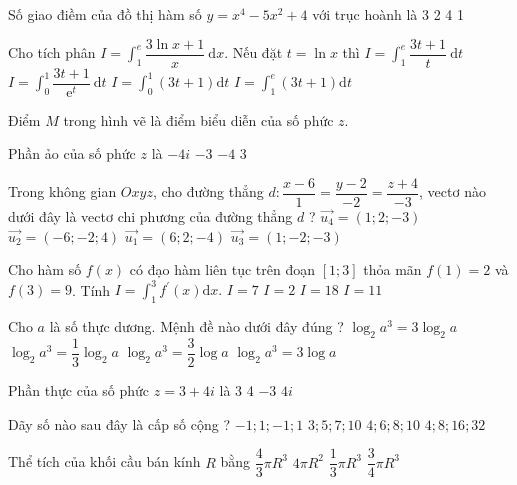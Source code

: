 \begin{ex}
 Số giao điềm của đồ thị hàm số $y=x^{4}-5 x^{2}+4$ với trục hoành là
\choice
{3}
{2}
{4}
{1}
\end{ex}

\begin{ex}
 Cho tích phân $I=\int_{1}^{e} \dfrac{3 \ln x+1}{x} \mathrm{~d} x$. Nếu đặt $t=\ln x$ thì
\choice
{$I=\int_{1}^{e} \dfrac{3 t+1}{t} \mathrm{~d} t$}
{$I=\int_{0}^{1} \dfrac{3 t+1}{\mathrm{e}^{t}} \mathrm{~d} t$}
{$I=\int_{0}^{1}(3 t+1) \mathrm{d} t$}
{$I=\int_{1}^{e}(3 t+1) \mathrm{d} t$}
\end{ex}

\begin{ex}
 Điểm $M$ trong hình vẽ là điểm biểu diễn của số phức $z$.

Phần ảo của số phức $z$ là
\choice
{$-4 i$}
{$-3$}
{$-4$}
{3}
\end{ex}

\begin{ex}
 Trong không gian $O x y z$, cho đường thẳng $d: \dfrac{x-6}{1}=\dfrac{y-2}{-2}=\dfrac{z+4}{-3}$, vectơ nào dưới đây là vectơ chi phương của đường thẳng $d$ ?
\choice
{$\overrightarrow{u_{4}}=(1; 2;-3)$}
{$\overrightarrow{u_{2}}=(-6;-2; 4)$}
{$\overrightarrow{u_{1}}=(6; 2;-4)$}
{$\overrightarrow{u_{3}}=(1;-2;-3)$}
\end{ex}

\begin{ex}
 Cho hàm số $f(x)$ có đạo hàm liên tục trên đoạn $[1; 3]$ thỏa mãn $f(1)=2$ và $f(3)=9$. Tính $I=\int_{1}^{3} f^{\prime}(x) \mathrm{d} x.$
\choice
{$I=7$}
{$I=2$}
{$I=18$}
{$I=11$}
\end{ex}

\begin{ex}
 Cho $a$ là số thực dương. Mệnh đề nào dưới đây đúng ?
\choice
{$\log _{2} a^{3}=3 \log _{2} a$}
{$\log _{2} a^{3}=\dfrac{1}{3} \log _{2} a$}
{$\log _{2} a^{3}=\dfrac{3}{2} \log a$}
{$\log _{2} a^{3}=3 \log a$}
\end{ex}

\begin{ex}
 Phần thực của số phức $z=3+4 i$ là
\choice
{3}
{4}
{$-3$}
{$4 i$}
\end{ex}

\begin{ex}
 Dãy số nào sau đây là cấp số cộng ?
\choice
{$-1; 1;-1; 1$}
{$3; 5; 7; 10$}
{$4; 6; 8; 10$}
{$4; 8; 16; 32$}
\end{ex}

\begin{ex}
 Thể tích của khối cầu bán kính $R$ bằng
\choice
{$\dfrac{4}{3} \pi R^{3}$}
{$4 \pi R^{2}$}
{$\dfrac{1}{3} \pi R^{3}$}
{$\dfrac{3}{4} \pi R^{3}$}
\end{ex}

